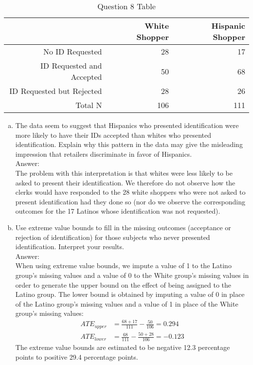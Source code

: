\documentclass[11pt,notitlepage]{article}\usepackage[]{graphicx}\usepackage[]{color}
\begin{document}
\begin{table}[htbp]
  \centering
  \caption{Question 8 Table}
    \begin{tabular}{rrr}
    \toprule
          & White Shopper  & Hispanic Shopper  \\
    \midrule
    No ID Requested  & 28    & 17 \\
    ID Requested and Accepted  & 50    & 68 \\
    ID Requested but Rejected  & 28    & 26 \\
    Total N  & 106   & 111 \\
    \bottomrule
    \end{tabular}%
  \label{tab:addlabel}%
\end{table}%

\begin{enumerate}[a)]
\item The data seem to suggest that Hispanics who presented identification were more likely to have their IDs accepted than whites who presented identification. Explain why this pattern in the data may give the misleading impression that retailers discriminate in favor of Hispanics.\\
Answer:\\
The problem with this interpretation is that whites were less likely to be asked to present their identification.  We therefore do not observe how the clerks would have responded to the 28 white shoppers who were not asked to present identification had they done so (nor do we observe the corresponding outcomes for the 17 Latinos whose identification was not requested).
\item Use extreme value bounds to fill in the missing outcomes (acceptance or rejection of identification) for those subjects who never presented identification. Interpret your results. \\
Answer:\\
When using extreme value bounds, we impute a value of 1 to the Latino group's missing values and a value of 0 to the White group's missing values in order to generate the upper bound on the effect of being assigned to the Latino group. The lower bound is obtained by imputing a value of 0 in place of the Latino group's missing values and a value of 1 in place of the White group's missing values:
\begin{align*}
ATE_{upper} &= \frac{68+17}{111} - \frac{50}{106} = 0.294\\
ATE_{lower} &= \frac{68}{111} - \frac{50+28}{106} = -0.123
\end{align*}
The extreme value bounds are estimated to be negative 12.3 percentage points to positive 29.4 percentage points.


\end{enumerate}
\end{document}
